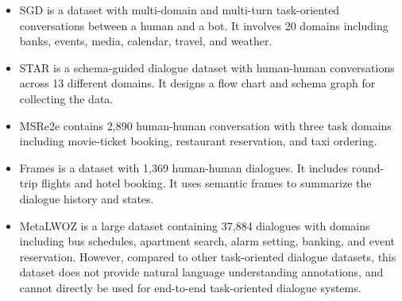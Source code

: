 \begin{itemize}
  \item SGD \cite{rastogi2020towards} is a dataset with multi-domain and multi-turn task-oriented conversations between a human and a bot.
  It involves 20 domains including banks, events, media, calendar, travel, and weather.
 
  \item STAR \cite{mosig2020star} is a schema-guided dialogue dataset with human-human conversations across 13 different domains. It designs a flow chart and schema graph for collecting the data.
 
  \item MSRe2e \cite{li2018microsoft} contains 2,890 human-human conversation with three task domains including movie-ticket booking, restaurant reservation, and taxi ordering. 
  
  \item Frames \cite{schulz-etal-2017-frame} is a dataset with 1,369 human-human dialogues. It includes round-trip flights and hotel booking. It uses semantic frames to summarize the dialogue history and states.
  
  \item MetaLWOZ \cite{shalyminov2020fast} is a large dataset containing 37,884 dialogues with domains including bus schedules, apartment search, alarm setting, banking, and event reservation. However, compared to other task-oriented dialogue datasets, this dataset does not provide natural language understanding annotations, and cannot directly be used for end-to-end task-oriented dialogue systems.
  
\end{itemize}

    
    

